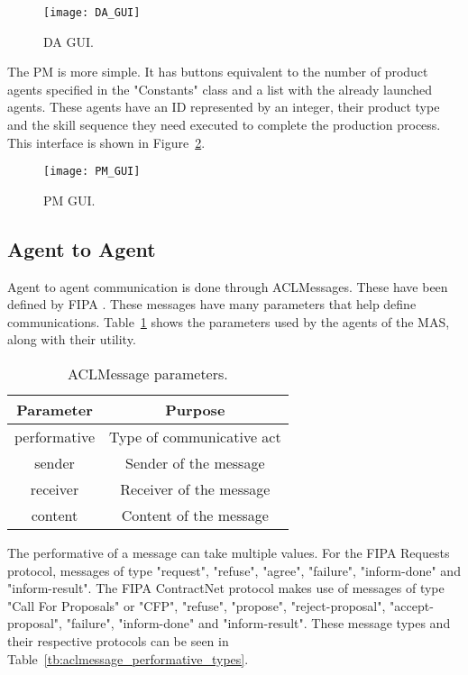 \begin{figure}[h!]
	\centering
	\texttt{[image: DA\_GUI]}
	\caption{\acrlong{DA} \acrlong{GUI}.}
	\label{fig:da_gui}
\end{figure}

The \acrshort{PM} is more simple. It has buttons equivalent to the number of product agents specified in the "Constants" class and a list with the already launched agents. These agents have an ID represented by an integer, their product type and the skill sequence they need executed to complete the production process. This interface is shown in Figure~\ref{fig:pm_gui}.

\begin{figure}[h!]
	\centering
	\texttt{[image: PM\_GUI]}
	\caption{\acrlong{PM} \acrlong{GUI}.}
	\label{fig:pm_gui}
\end{figure}

\subsection{Agent to Agent}
\label{subsec:agent_to_agent_interface}

Agent to agent communication is done through ACLMessages. These have been defined by \acrshort{FIPA} \cite{FIPA_ACLMessage}. These messages have many parameters that help define communications. Table~\ref{tb:aclmessage_parameters} shows the parameters used by the agents of the \acrshort{MAS}, along with their utility.\\

\begin{table}[h!]
	\centering
	\caption{ACLMessage parameters.}
	\begin{tabular}{|c|c|}
		\hline
		Parameter    & Purpose                   \\ \hline
		performative & Type of communicative act \\ \hline
		sender       & Sender of the message     \\ \hline
		receiver     & Receiver of the message   \\ \hline
		content      & Content of the message    \\ \hline
	\end{tabular}
	\label{tb:aclmessage_parameters}
\end{table}

The performative of a message can take multiple values. For the \acrshort{FIPA} Requests protocol, messages of type "request", "refuse", "agree", "failure", "inform-done" and "inform-result". The \acrshort{FIPA} ContractNet protocol makes use of messages of type "Call For Proposals" or "CFP", "refuse", "propose", "reject-proposal", "accept-proposal", "failure", "inform-done" and "inform-result". These message types and their respective protocols can be seen in Table~\ref{tb:aclmessage_performative_types}.\\

